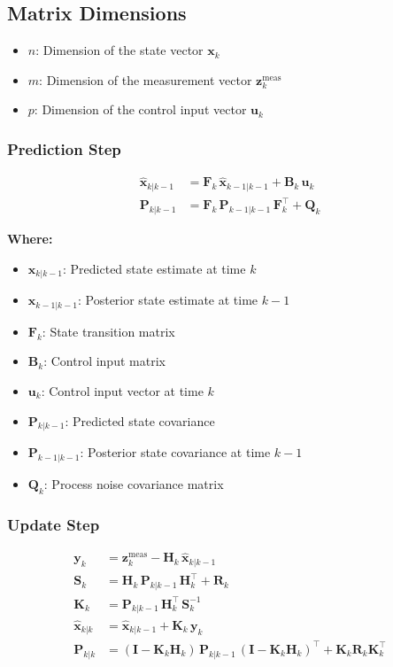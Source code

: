 \documentclass[11pt,letterpaper]{article}
\begin{document}
\subsection*{Matrix Dimensions}
\begin{itemize}
  \item $n$: Dimension of the state vector $\bm{x}_k$
  \item $m$: Dimension of the measurement vector $\bm{z}_k^{\text{meas}}$
  \item $p$: Dimension of the control input vector $\bm{u}_k$
\end{itemize}

\subsubsection*{Prediction Step}
\begin{align}
    \hat{\mathbf{x}}_{k|k-1} &= \mathbf{F}_k \, \hat{\mathbf{x}}_{k-1|k-1} + \mathbf{B}_k \, \mathbf{u}_k \\
    \mathbf{P}_{k|k-1} &= \mathbf{F}_k \, \mathbf{P}_{k-1|k-1} \, \mathbf{F}_k^\top + \mathbf{Q}_k
\end{align}

\textbf{Where:}
\begin{itemize}
  \item $\bm{x}_{k|k-1}$: Predicted state estimate at time $k$
  \item $\bm{x}_{k-1|k-1}$: Posterior state estimate at time $k-1$
  \item $\mathbf{F}_k$: State transition matrix
  \item $\mathbf{B}_k$: Control input matrix
  \item $\bm{u}_k$: Control input vector at time $k$
  \item $\mathbf{P}_{k|k-1}$: Predicted state covariance
  \item $\mathbf{P}_{k-1|k-1}$: Posterior state covariance at time $k-1$
  \item $\mathbf{Q}_k$: Process noise covariance matrix
\end{itemize}

\subsubsection*{Update Step}
\begin{align}
    \mathbf{y}_k &= \mathbf{z}^{\text{meas}}_k - \mathbf{H}_k \, \hat{\mathbf{x}}_{k|k-1} \\
    \mathbf{S}_k &= \mathbf{H}_k \, \mathbf{P}_{k|k-1} \, \mathbf{H}_k^\top + \mathbf{R}_k \\
    \mathbf{K}_k &= \mathbf{P}_{k|k-1} \, \mathbf{H}_k^\top \, \mathbf{S}_k^{-1} \\
    \hat{\mathbf{x}}_{k|k} &= \hat{\mathbf{x}}_{k|k-1} + \mathbf{K}_k \, \mathbf{y}_k \\
    \mathbf{P}_{k|k} &= (\mathbf{I} - \mathbf{K}_k \mathbf{H}_k) \, \mathbf{P}_{k|k-1} \, (\mathbf{I} - \mathbf{K}_k \mathbf{H}_k)^\top + \mathbf{K}_k \mathbf{R}_k \mathbf{K}_k^\top
\end{align}
\end{document}
